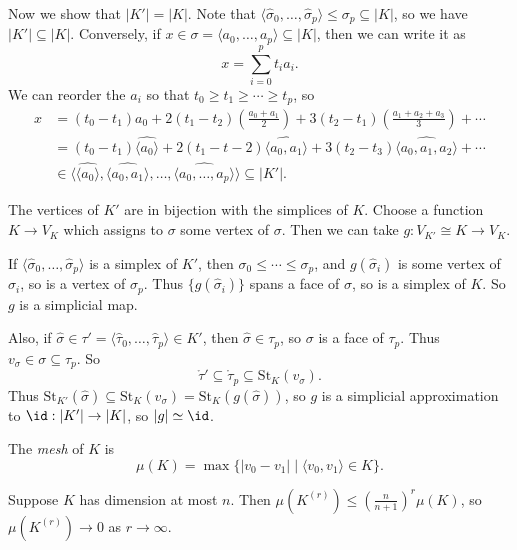 \documentclass[12pt]{article}
\begin{document}
\begin{proofbox}
Now we show that $|K'| = |K|$. Note that $\langle \hat \sigma_0, \ldots, \hat \sigma_p\rangle \leq \sigma_p \subseteq |K|$, so we have $|K'| \subseteq |K|$. Conversely, if $x \in \sigma = \langle a_0, \ldots, a_p\rangle \subseteq |K|$, then we can write it as
\[
x = \sum_{i = 0}^p t_i a_i.
\]
We can reorder the $a_i$ so that $t_0 \geq t_1 \geq \cdots \geq t_p$, so
\begin{align*}
	x &= (t_0 - t_1) a_0 + 2(t_1 - t_2) \left( \frac{a_0 + a_1}{2} \right) + 3 (t_2 - t_1) \left( \frac{a_1 + a_2 + a_3}{3} \right) + \cdots \\
	  &= (t_0 - t_1) \widehat{\langle a_0\rangle} + 2 (t_1 - t-2) \widehat{\langle a_0, a_1 \rangle} + 3 (t_2 - t_3) \widehat{\langle a_0, a_1, a_2 \rangle} + \cdots \\
	  &\in \langle \widehat{\langle a_0 \rangle}, \widehat{\langle a_0, a_1 \rangle}, \ldots, \widehat{ \langle a_0, \ldots, a_p \rangle} \rangle \subseteq |K'|.
\end{align*}
\end{proofbox}

The vertices of $K'$ are in bijection with the simplices of $K$. Choose a function $K \to V_K$ which assigns to $\sigma$ some vertex of $\sigma$. Then we can take $g : V_{K'} \cong K \to V_K$.

If $\langle \hat \sigma_0, \ldots, \hat \sigma_p \rangle$ is a simplex of $K'$, then $\sigma_0 \leq \cdots \leq \sigma_p$, and $g(\hat \sigma_i)$ is some vertex of $\sigma_i$, so is a vertex of $\sigma_p$. Thus $\{g(\hat \sigma_i)\}$ spans a face of $\sigma$, so is a simplex of $K$. So $g$ is a simplicial map.

Also, if $\hat \sigma \in \tau' = \langle \hat \tau_0, \ldots, \hat \tau_p \rangle \in K'$, then $\hat \sigma \in \tau_p$, so $\sigma$ is a face of $\tau_p$. Thus $v_\sigma \in \sigma \subseteq \tau_p$. So
\[
\mathring \tau' \subseteq \mathring \tau_p \subseteq \mathrm{St}_K(v_\sigma).
\]
Thus $\mathrm{St}_{K'}(\hat \sigma) \subseteq \mathrm{St}_K(v_\sigma) = \mathrm{St}_K(g(\hat \sigma))$, so $g$ is a simplicial approximation to $\id : |K'| \to |K|$, so $|g| \simeq \id$.

\begin{definition}
	The \emph{mesh} of $K$ is
	\[
		\mu(K) = \max\{|v_0 - v_1| \mid \langle v_0, v_1 \rangle \in K\}.
	\]
\end{definition}

\begin{lemma}
	Suppose $K$ has dimension at most $n$. Then $\mu(K^{(r)}) \leq (\frac{n}{n+1})^r \mu(K)$, so $\mu(K^{(r)}) \to 0$ as $r \to \infty$.
\end{lemma}
\end{document}
